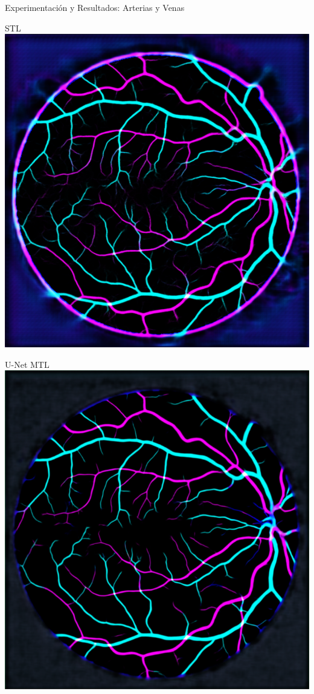 \documentclass[xcolor=dvipsnames,table]{beamer}
\begin{document}
\begin{frame}{Experimentación y Resultados: Arterias y Venas}
	\centering
	\begin{minipage}[b]{0.13\textwidth}
		\centering
		STL\\[0.2cm]
		\includegraphics[width=\linewidth]{my_images/video/AVSTL.png}
	\end{minipage}\hfill
	\begin{minipage}[b]{0.13\textwidth}
		\centering
		U-Net MTL\\[0.2cm]
		\includegraphics[width=\linewidth]{my_images/video/AVUNETMTL.png}

\end{minipage}
\end{frame}
\end{document}
